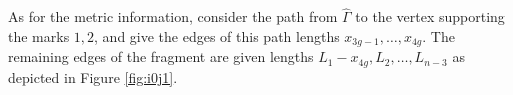 \documentclass[11pt,reqno]{amsart}
\theoremstyle{definition}
\begin{document}
As for the metric information, consider the path from $\widehat \Gamma$ to the vertex supporting the marks $1,2$, and give the edges of this path lengths $x_{3g-1}, \ldots, x_{4g}$. The remaining edges of the fragment are given lengths $L_1-x_{4g}, L_2, \ldots, L_{n-3}$ as depicted in Figure \ref{fig:i0j1}.

\end{document}
